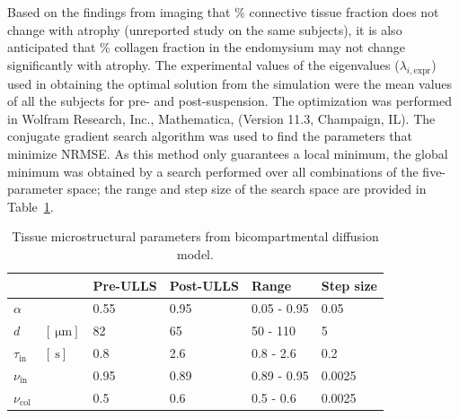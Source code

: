 Based on the findings from imaging that \% connective tissue fraction does not change with atrophy (unreported study on the same subjects), it is also anticipated that \% collagen fraction in the endomysium may not change significantly with atrophy. 
The experimental values of the eigenvalues ($\lambda_{i,\mathrm{expr}}$) used in obtaining the optimal solution from the simulation were the mean values of all the subjects for pre- and post-suspension. 
The optimization was performed in Wolfram Research, Inc., Mathematica, (Version 11.3, Champaign, IL). 
The conjugate gradient search algorithm was used to find the parameters that minimize NRMSE. 
As this method only guarantees a local minimum, the global minimum was obtained by a search performed over all combinations of the five-parameter space; the range and step size of the search space are provided in Table~\ref{tab: Karger2}.
\begin{table}[!htb]
\vspace{+0.2cm}
\caption[Tissue microstructural parameters from bicompartmental diffusion model]{Tissue microstructural parameters from bicompartmental diffusion model.}
\label{tab: Karger2}
\begin{center}
\begin{tabular}{@{}llllll@{}}
\toprule[1pt]\midrule[0.3pt]
  & & Pre-ULLS & Post-ULLS & Range     & Step size \\ \midrule
$\alpha$     & & 0.55     & 0.95      & 0.05 - 0.95 & 0.05      \\[6pt]
$d$ & $[\SI{}{\micro\meter}]$   & 82       & 65        & 50 - 110    & 5         \\[6pt]
$\tau_{\mathrm{in}}$ & $\left[\SI{}{\second}\right]$   & 0.8      & 2.6       & 0.8 - 2.6   & 0.2       \\[6pt]
$\nu_{\mathrm{in}}$  & &0.95     & 0.89      & 0.89 - 0.95 & 0.0025    \\[6pt]
$\nu_{\mathrm{col}}$ & &0.5      & 0.6       & 0.5 - 0.6   & 0.0025    \\ \midrule[0.3pt]\toprule[1pt]
\end{tabular}
\end{center}
\vspace{-0.2cm}
\end{table}
